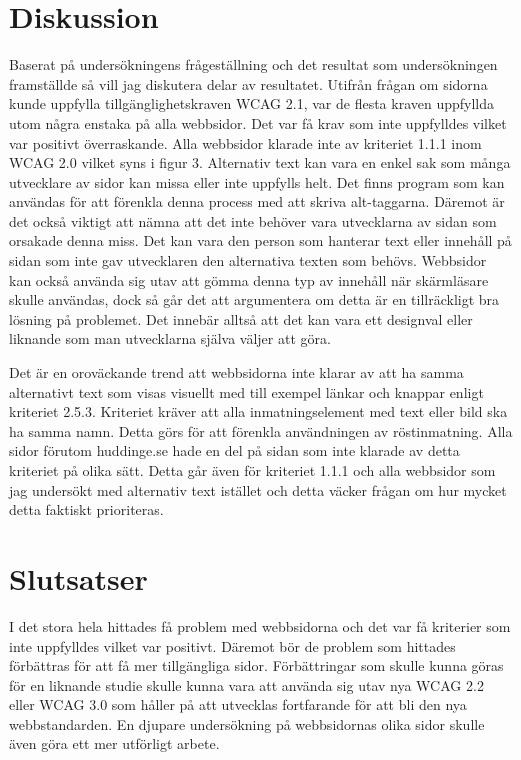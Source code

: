 \documentclass[11p]{article}
\begin{document}
    \section{Diskussion}
    Baserat på undersökningens frågeställning och det resultat som undersökningen framställde så vill jag diskutera delar av resultatet.
    Utifrån frågan om sidorna kunde uppfylla tillgänglighetskraven WCAG 2.1, var de flesta kraven uppfyllda utom några enstaka på alla webbsidor.
    Det var få krav som inte uppfylldes vilket var positivt överraskande.
    Alla webbsidor klarade inte av kriteriet 1.1.1 inom WCAG 2.0 vilket syns i figur 3.
    Alternativ text kan vara en enkel sak som många utvecklare av sidor kan missa eller inte uppfylls helt.
    Det finns program som kan användas för att förenkla denna process med att skriva alt-taggarna.
    Däremot är det också viktigt att nämna att det inte behöver vara utvecklarna av sidan som orsakade denna miss.
    Det kan vara den person som hanterar text eller innehåll på sidan som inte gav utvecklaren den alternativa texten som behövs.
    Webbsidor kan också använda sig utav att gömma denna typ av innehåll när skärmläsare skulle användas, dock så går det att argumentera om detta är en tillräckligt bra lösning på problemet.
    Det innebär alltså att det kan vara ett designval eller liknande som man utvecklarna själva väljer att göra.

    Det är en oroväckande trend att webbsidorna inte klarar av att ha samma alternativt text som visas visuellt med till exempel länkar och knappar enligt kriteriet 2.5.3.
    Kriteriet kräver att alla inmatningselement med text eller bild ska ha samma namn.
    Detta görs för att förenkla användningen av röstinmatning.
    Alla sidor förutom huddinge.se hade en del på sidan som inte klarade av detta kriteriet på olika sätt.
    Detta går även för kriteriet 1.1.1 och alla webbsidor som jag undersökt med alternativ text istället och detta väcker frågan om hur mycket detta faktiskt prioriteras.
    
    \section{Slutsatser}
    I det stora hela hittades få problem med webbsidorna och det var få kriterier som inte uppfylldes vilket var positivt.
    Däremot bör de problem som hittades förbättras för att få mer tillgängliga sidor.
    Förbättringar som skulle kunna göras för en liknande studie skulle kunna vara att använda sig utav nya WCAG 2.2 eller WCAG 3.0 som håller på att utvecklas fortfarande för att bli den nya webbstandarden.
    En djupare undersökning på webbsidornas olika sidor skulle även göra ett mer utförligt arbete.


    \printbibliography
\end{document}

